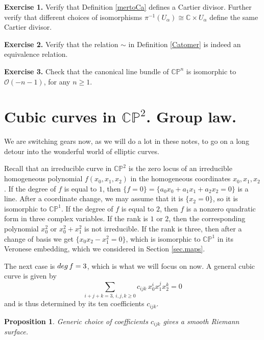 \documentclass[11pt]{article}
\numberwithin{equation}{section}
\numberwithin{footnote}{section}
\newtheorem{prop}[thm]{Proposition}
\renewcommand{\P}{{\mathbb P}}
\newcommand{\C}{{\mathbb C}}
\begin{document}
\smallskip
{\bf Exercise 1.}  Verify that Definition \ref{mertoCa} defines a Cartier divisor. Further verify that different choices of isomorphisms $\pi^{-1}(U_\alpha)\cong \C\times U_\alpha$ define the same Cartier divisor. 

{\bf Exercise 2.} Verify that the relation $\sim$ in Definition \ref{Catomer} is indeed an equivalence relation.

{\bf Exercise 3.}  Check that the canonical line bundle of $\C\P^n$ is isomorphic to $\mathcal O(-n-1)$, for any $n\geq 1$.


\section{Cubic curves in $\C\P^2$. Group law.}\label{cubicP2}
We are switching gears now, as we will do a lot in these notes, to go on a long detour into the wonderful world of elliptic curves.

\smallskip
Recall that an irreducible curve in $\C\P^2$ is the zero locus of an irreducible homogeneous polynomial $f(x_0,x_1,x_2)$ in the homogeneous coordinates $x_0,x_1,x_2$. 
If the degree of $f$ is equal to $1$, then $\{f=0\}=\{a_0x_0+a_1x_1+a_2x_2=0\}$ is a line. After a coordinate change, we may assume that it is $\{x_2=0\}$, so it is isomorphic to $\C\P^1$.
If the degree of $f$ is equal to $2$, then $f$ is a nonzero quadratic form in three complex variables. If the rank is $1$ or $2$, then the corresponding polynomial $x_0^2$ or $x_0^2+x_1^2$ is not irreducible. If the rank is three, then after a change of basis we get $\{x_0x_2-x_1^2=0\}$, which is isomorphic to $\C\P^1$ in its Veronese embedding, which we considered in Section \ref{sec.maps}.

\smallskip
The next case is ${\rm deg}\,f =3$, which is what we will focus on now. A general cubic curve is given by
$$
\sum_{i+j+k=3,\,i,j,k\geq 0}c_{ijk} \,x_0^ix_1^jx_2^k=0
$$
and is thus determined by its ten coefficients $c_{ijk}$.

\smallskip
\begin{prop} Generic choice of coefficients $c_{ijk}$ gives a smooth Riemann surface.
\end{prop}
\end{document}
